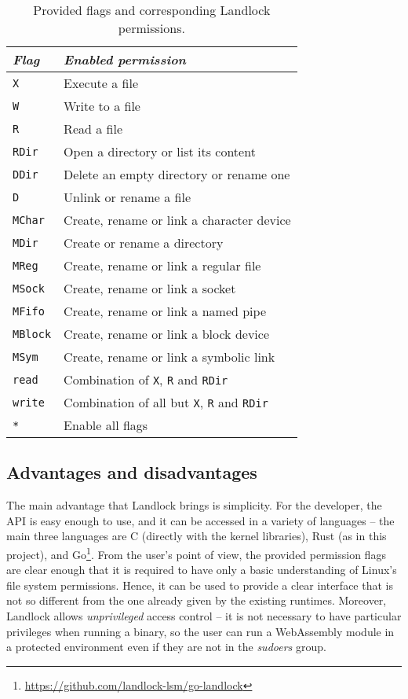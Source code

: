 \begin{table}[hbt]
  \centering
  \begin{tabular}{|l|l|}
    \hline
    \textit{Flag} & \textit{Enabled permission} \\ \hline\hline
    \texttt{X} & Execute a file \\ \hline
    \texttt{W} & Write to a file \\ \hline
    \texttt{R} & Read a file \\ \hline
    \texttt{RDir} & Open a directory or list its content \\ \hline
    \texttt{DDir} & Delete an empty directory or rename one \\ \hline
    \texttt{D} & Unlink or rename a file \\ \hline
    \texttt{MChar} & Create, rename or link a character device \\ \hline
    \texttt{MDir} & Create or rename a directory \\ \hline
    \texttt{MReg} & Create, rename or link a regular file \\ \hline
    \texttt{MSock} & Create, rename or link a socket \\ \hline
    \texttt{MFifo} & Create, rename or link a named pipe \\ \hline
    \texttt{MBlock} & Create, rename or link a block device \\ \hline
    \texttt{MSym} & Create, rename or link a symbolic link \\ \hline
    \texttt{read} & Combination of \texttt{X}, \texttt{R} and \texttt{RDir} \\ \hline
    \texttt{write} & Combination of all but \texttt{X}, \texttt{R} and \texttt{RDir} \\ \hline
    \texttt{*} & Enable all flags \\ \hline
  \end{tabular}
  \caption{Provided flags and corresponding Landlock permissions.}
  \label{table:landlock-flags}
\end{table}

\clearpage
\subsection{Advantages and disadvantages}

The main advantage that Landlock brings is simplicity. For the developer, the API is easy enough to use,
and it can be accessed in a variety of languages -- the main three languages are C (directly with the kernel libraries),
Rust (as in this project), and Go\footnote{\url{https://github.com/landlock-lsm/go-landlock}}.
From the user's point of view, the provided permission flags are clear enough that it is required to have
only a basic understanding of Linux's file system permissions.
Hence, it can be used to provide a clear interface that is not so different from the one already given by
the existing runtimes.
Moreover, Landlock allows \textit{unprivileged} access control -- it is not necessary to have particular privileges
when running a binary, so the user can run a WebAssembly module in a protected environment even if they are not
in the \textit{sudoers} group.

